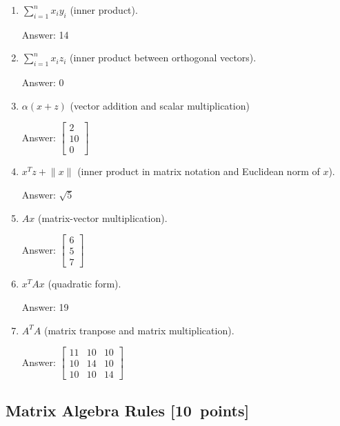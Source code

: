 \documentclass{article}
\newenvironment{answer}{\par\begingroup\color{gre}Answer: }{\endgroup}
\newcommand\pts[1]{\textcolor{pointscolour}{[#1~points]}}
\newcommand{\norm}[1]{\lVert #1 \rVert}
\begin{document}
  \begin{enumerate}
  \item $\sum_{i=1}^n x_iy_i$ (inner product).
  \begin{answer}
    14
  \end{answer}
  \item $\sum_{i=1}^n x_i z_i$ (inner product between orthogonal vectors).
  \begin{answer}
    0
  \end{answer}
  \item $\alpha(x+z)$ (vector addition and scalar multiplication)
  \begin{answer}
    $\left[\begin{array}{c}
      2\\
      10\\
      0
    \end{array}\right]$
  \end{answer}
  \item $x^Tz + \norm{x}$ (inner product in matrix notation and Euclidean norm of $x$).
  \begin{answer}
    $\sqrt{5}$
  \end{answer}
  \item $Ax$ (matrix-vector multiplication).
  \begin{answer}
    $\left[\begin{array}{c}
      6\\
      5\\
      7
    \end{array}\right]$
  \end{answer}
  \item $x^TAx$ (quadratic form).
  \begin{answer}
    19
  \end{answer}
  \item $A^TA$ (matrix tranpose and matrix multiplication).
  \begin{answer}
    $\left[\begin{array}{ccc}
      11 & 10 & 10\\
      10 & 14 & 10\\
      10 & 10 & 14
    \end{array}\right]$
  \end{answer}
  \end{enumerate}

  \subsection{Matrix Algebra Rules \pts{10}}
\end{document}
